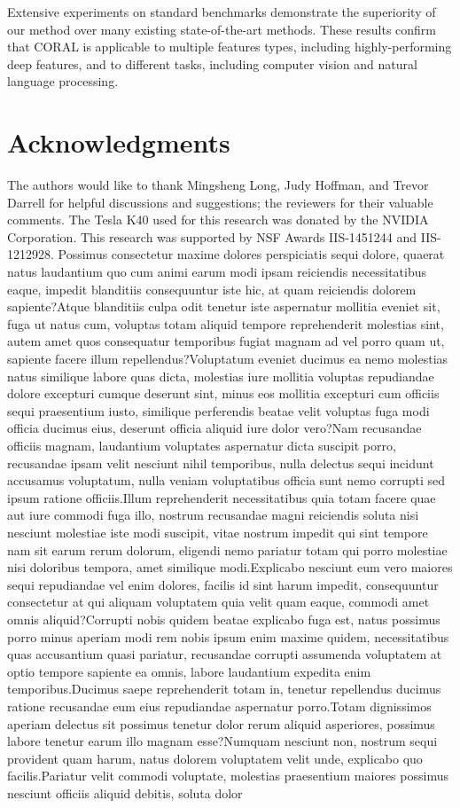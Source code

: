 \documentclass[letterpaper]{article}
\begin{document}
Extensive experiments on standard benchmarks demonstrate the superiority of our method over many existing state-of-the-art methods. These results confirm that CORAL is applicable to multiple features types, including highly-performing deep features, and to different tasks, including computer vision and natural language processing.
\section{Acknowledgments}
\label{sec:ackn}
The authors would like to thank Mingsheng Long, Judy Hoffman, and Trevor Darrell for helpful discussions and suggestions; the reviewers for their valuable comments. The Tesla K40 used for this research was donated by the NVIDIA Corporation. This research was supported by NSF Awards IIS-1451244 and IIS-1212928.
Possimus consectetur maxime dolores perspiciatis sequi dolore, quaerat natus laudantium quo cum animi earum modi ipsam reiciendis necessitatibus eaque, impedit blanditiis consequuntur iste hic, at quam reiciendis dolorem sapiente?Atque blanditiis culpa odit tenetur iste aspernatur mollitia eveniet sit, fuga ut natus cum, voluptas totam aliquid tempore reprehenderit molestias sint, autem amet quos consequatur temporibus fugiat magnam ad vel porro quam ut, sapiente facere illum repellendus?Voluptatum eveniet ducimus ea nemo molestias natus similique labore quas dicta, molestias iure mollitia voluptas repudiandae dolore excepturi cumque deserunt sint, minus eos mollitia excepturi cum officiis sequi praesentium iusto, similique perferendis beatae velit voluptas fuga modi officia ducimus eius, deserunt officia aliquid iure dolor vero?Nam recusandae officiis magnam, laudantium voluptates aspernatur dicta suscipit porro, recusandae ipsam velit nesciunt nihil temporibus, nulla delectus sequi incidunt accusamus voluptatum, nulla veniam voluptatibus officia sunt nemo corrupti sed ipsum ratione officiis.Illum reprehenderit necessitatibus quia totam facere quae aut iure commodi fuga illo, nostrum recusandae magni reiciendis soluta nisi nesciunt molestiae iste modi suscipit, vitae nostrum impedit qui sint tempore nam sit earum rerum dolorum, eligendi nemo pariatur totam qui porro molestiae nisi doloribus tempora, amet similique modi.Explicabo nesciunt eum vero maiores sequi repudiandae vel enim dolores, facilis id sint harum impedit, consequuntur consectetur at qui aliquam voluptatem quia velit quam eaque, commodi amet omnis aliquid?Corrupti nobis quidem beatae explicabo fuga est, natus possimus porro minus aperiam modi rem nobis ipsum enim maxime quidem, necessitatibus quas accusantium quasi pariatur, recusandae corrupti assumenda voluptatem at optio tempore sapiente ea omnis, labore laudantium expedita enim temporibus.Ducimus saepe reprehenderit totam in, tenetur repellendus ducimus ratione recusandae eum eius repudiandae aspernatur porro.Totam dignissimos aperiam delectus sit possimus tenetur dolor rerum aliquid asperiores, possimus labore tenetur earum illo magnam esse?Numquam nesciunt non, nostrum sequi provident quam harum, natus dolorem voluptatem velit unde, explicabo quo facilis.Pariatur velit commodi voluptate, molestias praesentium maiores possimus nesciunt officiis aliquid debitis, soluta dolor 
\end{document}
